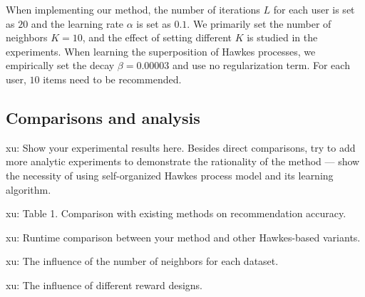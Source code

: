 \documentclass[runningheads]{llncs}
\newcommand{\xu}[1]{{\color{red} xu: #1}}
\begin{document}
When implementing our method, the number of iterations $L$ for each user is set as $20$ and the learning rate $\alpha$ is set as $0.1$. We primarily set
the number of neighbors $K=10$, and the effect of setting different $K$ is studied in the experiments.
When learning the superposition of Hawkes processes, we empirically set the decay $\beta=0.00003$ and use no regularization term.
For each user, $10$ items need to be recommended.



\subsection{Comparisons and analysis}
\xu{Show your experimental results here. Besides direct comparisons, try to add more analytic experiments to demonstrate the rationality of the method --- show the necessity of using self-organized Hawkes process model and its learning algorithm.}

\xu{Table 1. Comparison with existing methods on recommendation accuracy.}

\xu{Runtime comparison between your method and other Hawkes-based variants.}

\xu{The influence of the number of neighbors for each dataset.}

\xu{The influence of different reward designs.}
\end{document}
